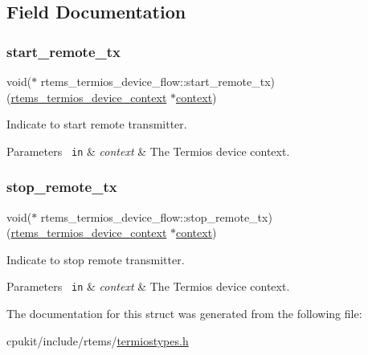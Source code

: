 \subsection{Field Documentation}
\mbox{\label{structrtems__termios__device__flow_ad3f79b8dc250a47d3ca460a192df057f}} 
\subsubsection{\texorpdfstring{start\_remote\_tx}{start\_remote\_tx}}
{\footnotesize\ttfamily void($\ast$ rtems\+\_\+termios\+\_\+device\+\_\+flow\+::start\+\_\+remote\+\_\+tx) (\mbox{\hyperlink{structrtems__termios__device__context}{rtems\+\_\+termios\+\_\+device\+\_\+context}} $\ast$\mbox{\hyperlink{sun4u_2tte_8h_a9b4a99475e2709333b8e5d70483173f1}{context}})}



Indicate to start remote transmitter. 


\begin{DoxyParams}[1]{Parameters}
\mbox{\texttt{ in}}  & {\em context} & The Termios device context. \\
\hline
\end{DoxyParams}
\mbox{\label{structrtems__termios__device__flow_a15c0be16b55cb8bec4002c36ca2eebb1}} 
\subsubsection{\texorpdfstring{stop\_remote\_tx}{stop\_remote\_tx}}
{\footnotesize\ttfamily void($\ast$ rtems\+\_\+termios\+\_\+device\+\_\+flow\+::stop\+\_\+remote\+\_\+tx) (\mbox{\hyperlink{structrtems__termios__device__context}{rtems\+\_\+termios\+\_\+device\+\_\+context}} $\ast$\mbox{\hyperlink{sun4u_2tte_8h_a9b4a99475e2709333b8e5d70483173f1}{context}})}



Indicate to stop remote transmitter. 


\begin{DoxyParams}[1]{Parameters}
\mbox{\texttt{ in}}  & {\em context} & The Termios device context. \\
\hline
\end{DoxyParams}


The documentation for this struct was generated from the following file\+:\begin{DoxyCompactItemize}
\item 
cpukit/include/rtems/\mbox{\hyperlink{termiostypes_8h}{termiostypes.\+h}}\end{DoxyCompactItemize}
